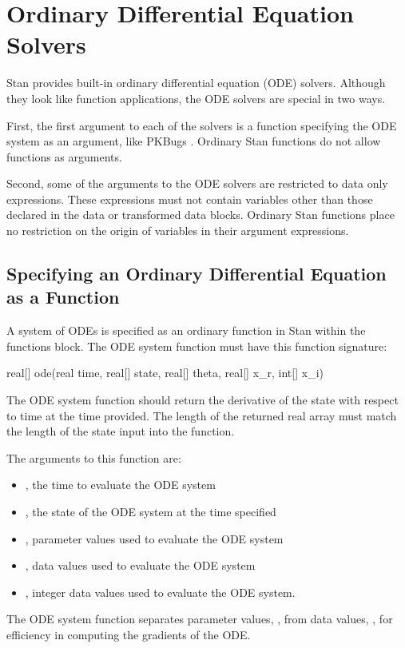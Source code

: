 \chapter{Ordinary Differential Equation Solvers}
\label{functions-ode-solver.chapter}

Stan provides built-in ordinary differential equation (ODE) solvers.
Although they look like function applications, the ODE solvers are
special in two ways.

First, the first argument to each of the solvers is a function
specifying the ODE system as an argument, like PKBugs
\citep{LunnEtAl:1999}. Ordinary Stan functions do not allow functions
as arguments.

Second, some of the arguments to the ODE solvers are restricted to
data only expressions. These expressions must not contain variables
other than those declared in the data or transformed data blocks.
Ordinary Stan functions place no restriction on the origin of variables
in their argument expressions.

\section{Specifying an Ordinary Differential Equation as a Function}
\label{functions-ode-function.section}

A system of ODEs is specified as an ordinary function in Stan within
the functions block. The ODE system function must have this function
signature:
%
\begin{stancode}
real[] ode(real time, real[] state, real[] theta,
           real[] x_r, int[] x_i)
\end{stancode}
%
The ODE system function should return the derivative of the state
with respect to time at the time provided. The length of the returned
real array must match the length of the state input into the
function.

The arguments to this function are:
\begin{itemize}
\item {}, the time to evaluate the ODE system
\item {}, the state of the ODE system at the time specified
\item {}, parameter values used to evaluate the ODE system
\item {}, data values used to evaluate the ODE system
\item {}, integer data values used to evaluate the ODE system.
\end{itemize}
%
The ODE system function separates parameter values, , from
data values, , for efficiency in computing the gradients of
the ODE.

